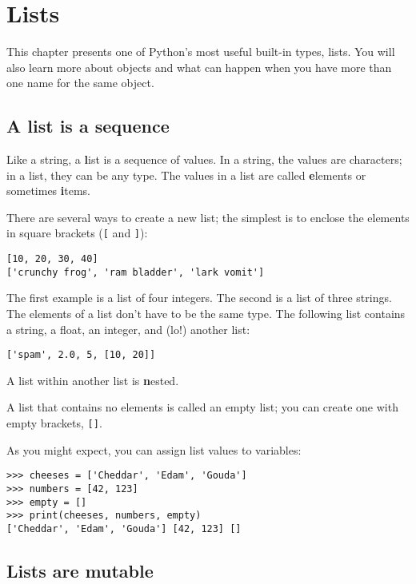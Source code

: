 \documentclass[
DIV=11,
fontsize=13,
twoside,
headinclude=false,
titlepage=firstiscover,
abstract=true,
headsepline=true,
footsepline=true,
chapterprefix=true, %
headings=big,
bibliography=totoc,%
captions=tableheading
]{scrbook}
\theoremstyle{definition}
\begin{document}
\chapter{Lists}

This chapter presents one of Python's most useful built-in types, lists.
You will also learn more about objects and what can happen when you have
more than one name for the same object.


\section{A list is a sequence}
\label{sequence}

Like a string, a {\textbf list} is a sequence of values.  In a string, the
values are characters; in a list, they can be any type.  The values in
a list are called {\textbf elements} or sometimes {\textbf items}.

There are several ways to create a new list; the simplest is to
enclose the elements in square brackets (\verb"[" and \verb"]"):

\begin{lstlisting}
[10, 20, 30, 40]
['crunchy frog', 'ram bladder', 'lark vomit']
\end{lstlisting}
%
The first example is a list of four integers.  The second is a list of
three strings.  The elements of a list don't have to be the same type.
The following list contains a string, a float, an integer, and
(lo!) another list:

\begin{lstlisting}
['spam', 2.0, 5, [10, 20]]
\end{lstlisting}
%
A list within another list is {\textbf nested}.

A list that contains no elements is
called an empty list; you can create one with empty
brackets, \verb"[]".

As you might expect, you can assign list values to variables:

\begin{lstlisting}
>>> cheeses = ['Cheddar', 'Edam', 'Gouda']
>>> numbers = [42, 123]
>>> empty = []
>>> print(cheeses, numbers, empty)
['Cheddar', 'Edam', 'Gouda'] [42, 123] []
\end{lstlisting}
%


\section{Lists are mutable}
\label{mutable}
\end{document}
